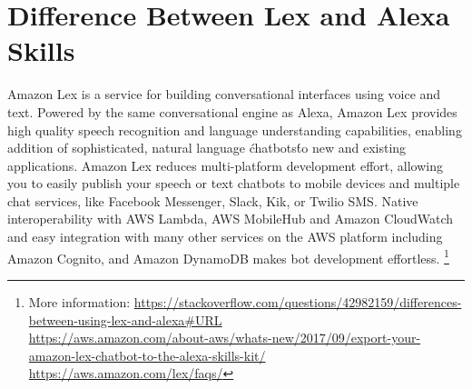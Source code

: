\section*{Difference Between Lex and Alexa Skills}
\label{lexAlexa}  

Amazon Lex is a service for building conversational interfaces using voice and text. Powered by the same conversational engine as Alexa, Amazon Lex provides high quality speech recognition and language understanding capabilities, enabling addition of sophisticated, natural language \'chatbots\' to new and existing applications. Amazon Lex reduces multi-platform development effort, allowing you to easily publish your speech or text chatbots to mobile devices and multiple chat services, like Facebook Messenger, Slack, Kik, or Twilio SMS. Native interoperability with AWS Lambda, AWS MobileHub and Amazon CloudWatch and easy integration with many other services on the AWS platform including Amazon Cognito, and Amazon DynamoDB makes bot development effortless. \footnote{
More information: \url{https://stackoverflow.com/questions/42982159/differences-between-using-lex-and-alexa\#URL}\\
\url{https://aws.amazon.com/about-aws/whats-new/2017/09/export-your-amazon-lex-chatbot-to-the-alexa-skills-kit/}\\
\url{https://aws.amazon.com/lex/faqs/}
}


















\clearpage

